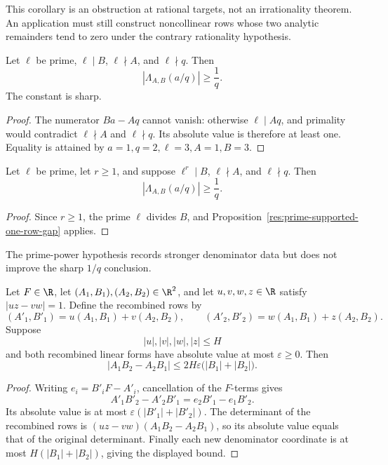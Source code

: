 This corollary is an obstruction at rational targets, not an irrationality
theorem.  An application must still construct noncollinear rows whose two
analytic remainders tend to zero under the contrary rationality hypothesis.

\begin{proposition}
\label{res:prime-supported-one-row-gap}
Let \(\ell\) be prime, \(\ell\mid B\), \(\ell\nmid A\), and
\(\ell\nmid q\).  Then
\[
 \left|\Lambda_{A,B}(a/q)\right|\ge\frac1q .
\]
The constant is sharp.
\end{proposition}

\begin{proof}
The numerator \(Ba-Aq\) cannot vanish: otherwise \(\ell\mid Aq\), and
primality would contradict \(\ell\nmid A\) and \(\ell\nmid q\).  Its
absolute value is therefore at least one.  Equality is attained by
\(a=1,q=2,\ell=3,A=1,B=3\).
\end{proof}

\begin{corollary}
\label{res:prime-power-supported-one-row-gap}
Let \(\ell\) be prime, let \(r\ge1\), and suppose
\(\ell^r\mid B\), \(\ell\nmid A\), and \(\ell\nmid q\).  Then
\[
 \left|\Lambda_{A,B}(a/q)\right|\ge\frac1q .
\]
\end{corollary}

\begin{proof}
Since \(r\ge1\), the prime \(\ell\) divides \(B\), and
Proposition~\ref{res:prime-supported-one-row-gap} applies.
\end{proof}

The prime-power hypothesis records stronger denominator data but does not
improve the sharp \(1/q\) conclusion.

\begin{proposition}
\label{res:unit-determinant-height-decay}
Let \(F\in\R\), let \((A_1,B_1),(A_2,B_2)\in\R^2\), and let
\(u,v,w,z\in\R\) satisfy \(|uz-vw|=1\).  Define the recombined rows by
\[
 (A'_1,B'_1)=u(A_1,B_1)+v(A_2,B_2),\qquad
 (A'_2,B'_2)=w(A_1,B_1)+z(A_2,B_2).
\]
Suppose
\[
 |u|,|v|,|w|,|z|\le H
\]
and both recombined linear forms have absolute value at most
\(\varepsilon\ge0\).  Then
\[
 |A_1B_2-A_2B_1|
 \le 2H\varepsilon\bigl(|B_1|+|B_2|\bigr).
\]
\end{proposition}

\begin{proof}
Writing \(e_i=B'_iF-A'_i\), cancellation of the \(F\)-terms gives
\[
 A'_1B'_2-A'_2B'_1=e_2B'_1-e_1B'_2.
\]
Its absolute value is at most
\(\varepsilon(|B'_1|+|B'_2|)\).  The determinant of the recombined rows is
\((uz-vw)(A_1B_2-A_2B_1)\), so its absolute value equals that of the original
determinant.  Finally each new denominator coordinate is at most
\(H(|B_1|+|B_2|)\), giving the displayed bound.
\end{proof}

